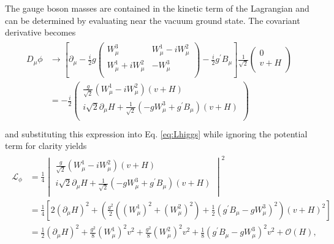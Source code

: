 The gauge boson masses are contained in the kinetic term of the Lagrangian and can be determined by evaluating near the vacuum ground state. The covariant derivative becomes
\begin{align}
  \begin{split}
    D_{\mu}\phi &\rightarrow \left[ \partial_{\mu} - \frac{i}{2}g \begin{pmatrix} W_{\mu}^{3} & W_{\mu}^{1} - iW_{\mu}^{2} \\ W_{\mu}^{1} + iW_{\mu}^{2} & -W_{\mu}^{3} \\ \end{pmatrix} - \frac{i}{2}g^{\prime}B_{\mu} \right] \frac{1}{\sqrt{2}} \begin{pmatrix} 0 \\ v + H \\ \end{pmatrix} \\[1em]
                &= -\frac{i}{2} \begin{pmatrix} \frac{g}{\sqrt{2}}(W_{\mu}^{1}-iW_{\mu}^{2})(v + H) \\ i\sqrt{2}\partial_{\mu}H + \frac{1}{\sqrt{2}}(-gW_{\mu}^{3} + g^{\prime}B_{\mu})(v + H) \\ \end{pmatrix} \\
  \end{split}
\end{align}
and substituting this expression into Eq. \ref{eq:Lhiggs} while ignoring the potential term for clarity yields
\begin{align}
  \begin{split}
    \mathcal{L}_{\phi} &= \frac{1}{4} \begin{vmatrix} \frac{g}{\sqrt{2}}(W_{\mu}^{1}-iW_{\mu}^{2})(v + H) \\ i\sqrt{2}\partial_{\mu}H + \frac{1}{\sqrt{2}}(-gW_{\mu}^{3} + g^{\prime}B_{\mu})(v + H) \\ \end{vmatrix}^{2} \\[1em]
                       &= \frac{1}{4} \left[ 2(\partial_{\mu}H)^{2} + \left( \frac{g^{2}}{2} \left( (W_{\mu}^{1})^{2} + (W_{\mu}^{2})^{2} \right) + \frac{1}{2} \left( g^{\prime}B_{\mu} - gW_{\mu}^{3} \right)^{2} \right) (v + H)^{2} \right] \\[1em]
                       &= \frac{1}{2}(\partial_{\mu}H)^{2} + \frac{g^{2}}{8}(W_{\mu}^{1})^{2}v^{2} + \frac{g^{2}}{8}(W_{\mu}^{2})^{2}v^{2} + \frac{1}{8}\left( g^{\prime}B_{\mu} - gW_{\mu}^{3} \right)^{2}v^{2} + \mathcal{O}(H), \\
    \label{eq:gaugemasses}
  \end{split}
\end{align}
